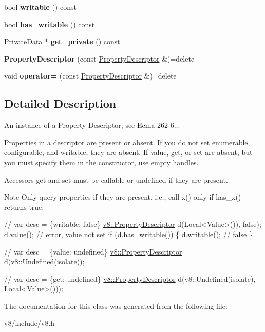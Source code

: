 \begin{DoxyCompactItemize}
bool {\bfseries writable} () const
\item 
\mbox{\label{classv8_1_1PropertyDescriptor_a3d348233abc24c49daf8770e714e39e1}} 
bool {\bfseries has\+\_\+writable} () const
\item 
\mbox{\label{classv8_1_1PropertyDescriptor_aea136ecc07fdc9483e007f4bc4c45e3e}} 
Private\+Data $\ast$ {\bfseries get\+\_\+private} () const
\item 
\mbox{\label{classv8_1_1PropertyDescriptor_ab06b5924a188d744797c44952d154fce}} 
{\bfseries Property\+Descriptor} (const \mbox{\hyperlink{classv8_1_1PropertyDescriptor}{Property\+Descriptor}} \&)=delete
\item 
\mbox{\label{classv8_1_1PropertyDescriptor_a924fcc63be20f822bdaacdd7bc967805}} 
void {\bfseries operator=} (const \mbox{\hyperlink{classv8_1_1PropertyDescriptor}{Property\+Descriptor}} \&)=delete
\end{DoxyCompactItemize}


\subsection{Detailed Description}
An instance of a Property Descriptor, see Ecma-\/262 6...

Properties in a descriptor are present or absent. If you do not set {\ttfamily enumerable}, {\ttfamily configurable}, and {\ttfamily writable}, they are absent. If {\ttfamily value}, {\ttfamily get}, or {\ttfamily set} are absent, but you must specify them in the constructor, use empty handles.

Accessors {\ttfamily get} and {\ttfamily set} must be callable or undefined if they are present.

\begin{DoxyNote}{Note}
Only query properties if they are present, i.\+e., call {\ttfamily x()} only if {\ttfamily has\+\_\+x()} returns true.
\end{DoxyNote}

\begin{DoxyCode}
\textcolor{comment}{// var desc = \{writable: false\}}
\mbox{\hyperlink{classv8_1_1PropertyDescriptor}{v8::PropertyDescriptor}} d(Local<Value>()), \textcolor{keyword}{false});
d.value(); \textcolor{comment}{// error, value not set}
\textcolor{keywordflow}{if} (d.has\_writable()) \{
  d.writable(); \textcolor{comment}{// false}
\}

\textcolor{comment}{// var desc = \{value: undefined\}}
\mbox{\hyperlink{classv8_1_1PropertyDescriptor}{v8::PropertyDescriptor}} d(v8::Undefined(isolate));

\textcolor{comment}{// var desc = \{get: undefined\}}
\mbox{\hyperlink{classv8_1_1PropertyDescriptor}{v8::PropertyDescriptor}} d(v8::Undefined(isolate), Local<Value>()));
\end{DoxyCode}
 

The documentation for this class was generated from the following file\+:\begin{DoxyCompactItemize}
\item 
v8/include/v8.\+h\end{DoxyCompactItemize}
